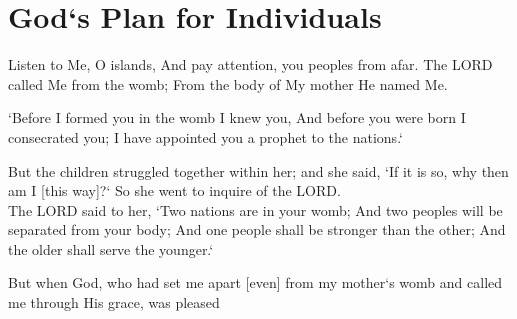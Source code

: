 \newpage

\section{God`s Plan for Individuals}
\begin{scripture}[Isaiah 49:1]
    Listen to Me, O islands, And pay attention, you peoples from afar. The LORD called Me from the womb; From the body of My mother He named Me.
\end{scripture}

\vspace{4\baselineskip}

\begin{scripture}[Jeremiah 1:5]
    `Before I formed you in the womb I knew you, And before you were born I consecrated you; I have appointed you a prophet to the nations.`
\end{scripture}

\vspace{4\baselineskip}

\begin{scripture}[Genesis 25:22-23]
    But the children struggled together within her; and she said, `If it is so, why then am I [this way]?` So she went to inquire of the LORD.\\
    The LORD said to her, `Two nations are in your womb; And two peoples will be separated from your body; And one people shall be stronger than the other; And the older shall serve the younger.`
\end{scripture}

\vspace{4\baselineskip}

\begin{scripture}[Galatians 1:15]
    But when God, who had set me apart [even] from my mother`s womb and called me through His grace, was pleased
\end{scripture}

\vspace{4\baselineskip}


\vspace{10\baselineskip}
